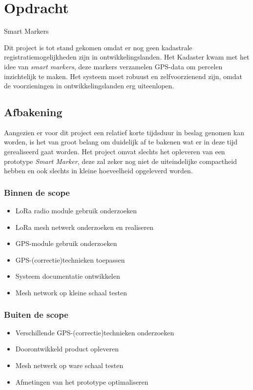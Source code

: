 \section{Opdracht}
\label{sec:opdracht}
Smart Markers

Dit project is tot stand gekomen omdat er nog geen kadastrale registratiemogelijkheden 
zijn in ontwikkelingslanden. Het Kadaster kwam met het idee van \textit{smart markers}, 
deze markers verzamelen GPS-data om percelen inzichtelijk te maken. Het systeem moet 
robuust en zelfvoorzienend zijn, omdat de voorzieningen in ontwikkelingslanden erg 
uiteenlopen.

\subsection{Afbakening}
Aangezien er voor dit project een relatief korte tijdsduur in beslag genomen
kan worden, is het van groot belang om duidelijk af te bakenen wat er in deze
tijd gerealiseerd gaat worden.
Het project omvat slechts het opleveren van een prototype \textit{Smart Marker},
deze zal zeker nog niet de uiteindelijke compactheid hebben en ook slechts in 
kleine hoeveelheid opgeleverd worden.

\subsubsection{Binnen de scope}
\begin{itemize}
    \item LoRa radio module gebruik onderzoeken
    \item LoRa mesh netwerk onderzoeken en realiseren
    \item GPS-module gebruik onderzoeken
    \item GPS-(correctie)technieken toepassen
    \item Systeem documentatie ontwikkelen
    \item Mesh network op kleine schaal testen
\end{itemize}

\subsubsection{Buiten de scope}
\begin{itemize}
    \item Verschillende GPS-(correctie)technieken onderzoeken
    \item Doorontwikkeld product opleveren
    \item Mesh netwerk op ware schaal testen
    \item Afmetingen van het prototype optimaliseren
\end{itemize}

